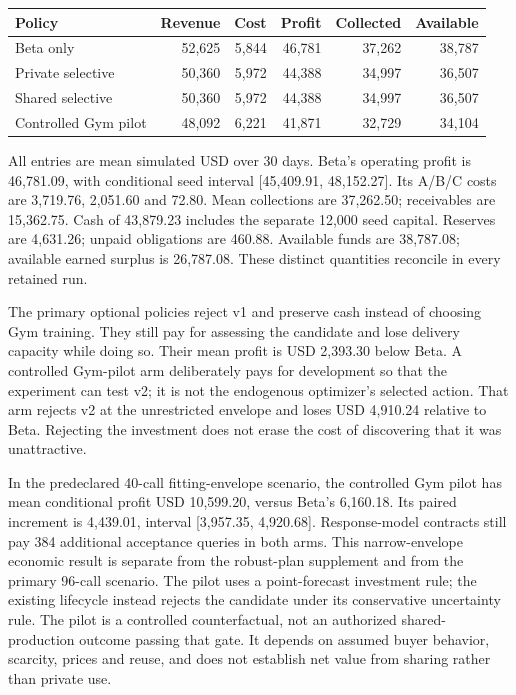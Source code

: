 \begin{center}\small\begin{tabular}{lrrrrr}
\toprule
Policy & Revenue & Cost & Profit & Collected & Available \\ \midrule
Beta only & 52,625 & 5,844 & 46,781 & 37,262 & 38,787 \\
Private selective & 50,360 & 5,972 & 44,388 & 34,997 & 36,507 \\
Shared selective & 50,360 & 5,972 & 44,388 & 34,997 & 36,507 \\
Controlled Gym pilot & 48,092 & 6,221 & 41,871 & 32,729 & 34,104 \\
\bottomrule
\end{tabular}\end{center}
All entries are mean simulated USD over 30 days. Beta's operating profit is 46,781.09, with conditional seed interval [45,409.91, 48,152.27]. Its A/B/C costs are 3,719.76, 2,051.60 and 72.80. Mean collections are 37,262.50; receivables are 15,362.75. Cash of 43,879.23 includes the separate 12,000 seed capital. Reserves are 4,631.26; unpaid obligations are 460.88. Available funds are 38,787.08; available earned surplus is 26,787.08. These distinct quantities reconcile in every retained run.

The primary optional policies reject v1 and preserve cash instead of choosing Gym training. They still pay for assessing the candidate and lose delivery capacity while doing so. Their mean profit is USD 2,393.30 below Beta. A controlled Gym-pilot arm deliberately pays for development so that the experiment can test v2; it is not the endogenous optimizer's selected action. That arm rejects v2 at the unrestricted envelope and loses USD 4,910.24 relative to Beta. Rejecting the investment does not erase the cost of discovering that it was unattractive.\par In the predeclared 40-call fitting-envelope scenario, the controlled Gym pilot has mean conditional profit USD 10,599.20, versus Beta's 6,160.18. Its paired increment is 4,439.01, interval [3,957.35, 4,920.68]. Response-model contracts still pay 384 additional acceptance queries in both arms. This narrow-envelope economic result is separate from the robust-plan supplement and from the primary 96-call scenario. The pilot uses a point-forecast investment rule; the existing lifecycle instead rejects the candidate under its conservative uncertainty rule. The pilot is a controlled counterfactual, not an authorized shared-production outcome passing that gate. It depends on assumed buyer behavior, scarcity, prices and reuse, and does not establish net value from sharing rather than private use.
